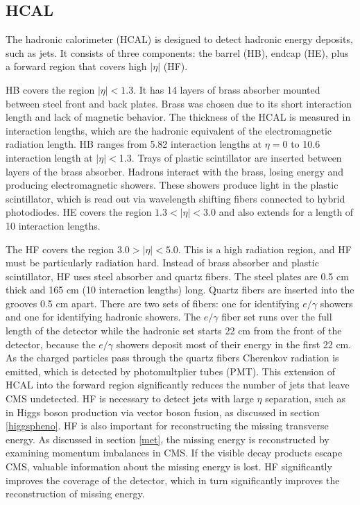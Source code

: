 \documentclass[oneside, letterpaper, oldfontcommands]{memoir}
\begin{document}
\subsection{HCAL}\label{hcal}

\qquad The hadronic calorimeter (HCAL) is designed to detect hadronic energy deposits, such as jets. It consists of three components: the barrel (HB), endcap (HE), plus a forward region that covers high $|\eta|$ (HF). 

\qquad HB covers the region $|\eta| < 1.3$. It has 14 layers of brass absorber mounted between steel front and back plates. Brass was chosen due to its short interaction length and lack of magnetic behavior. The thickness of the HCAL is measured in interaction lengths, which are the hadronic equivalent of the electromagnetic radiation length. HB ranges from 5.82 interaction lengths at $\eta = 0$ to 10.6 interaction length at $|\eta| < $1.3.  Trays of plastic scintillator are inserted between layers of the brass absorber. Hadrons interact with the brass, losing energy and producing electromagnetic showers. These showers produce light in the plastic scintillator, which is read out via wavelength shifting fibers connected to hybrid photodiodes. HE covers the region $1.3 < |\eta| < 3.0$ and also extends for a length of 10 interaction lengths.

\qquad The HF covers the region $3.0 > |\eta| < 5.0$. This is a high radiation region, and HF must be particularly radiation hard. Instead of brass absorber and plastic scintillator, HF uses steel absorber and quartz fibers. The steel plates are 0.5 cm thick and 165 cm (10 interaction lengths) long. Quartz fibers are inserted into the grooves 0.5 cm apart. There are two sets of fibers: one for identifying $e/\gamma$ showers and one for identifying hadronic showers. The $e/\gamma$ fiber set runs over the full length of the detector while the hadronic set starts 22 cm from the front of the detector, because the $e/\gamma$ showers deposit most of their energy in the first 22 cm. As the charged particles pass through the quartz fibers Cherenkov radiation is emitted, which is detected by photomultplier tubes (PMT). This extension of HCAL into the forward region significantly reduces the number of jets that leave CMS undetected. HF is necessary to detect jets with large $\eta$ separation, such as in Higgs boson production via vector boson fusion, as discussed in section \ref{higgspheno}. HF is also important for reconstructing the missing transverse energy. As discussed in section \ref{met}, the missing energy is reconstructed by examining momentum imbalances in CMS. If the visible decay products escape CMS, valuable information about the missing energy is lost. HF significantly improves the coverage of the detector, which in turn significantly improves the reconstruction of missing energy.
\end{document}
